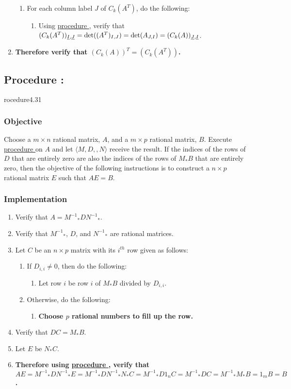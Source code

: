 \documentclass{article}
\newcommand{\ul}[1]{\protect\underline{#1}}
\newcounter{procedure}[part]
\newcommand{\procedure}[1]{\subsection*{Procedure \thepart:\theprocedure}\label{sec:procedure #1}\global\expandafter\edef\csname procedure#1\endcsname{\thepart:\theprocedure}\addtocounter{procedure}{1}}
\newcommand{\objective}{\subsubsection*{Objective}}
\newcommand{\implementation}{\subsubsection*{Implementation}}
\newcommand{\procedurehr}[1]{\hyperref[sec:procedure #1]{procedure \expandafter\csname procedure#1\endcsname}}
\begin{document}
\begin{multicols}{2}
\begin{enumerate}
					\begin{enumerate}
						\item For each column label $J$ of $C_k(A^T)$, do the following:
						\begin{enumerate}
							\item Using \procedurehr{4.29}, verify that $(C_k(A^T))_{\ul{I},\ul{J}}=\det((A^T)_{I,J})=\det(A_{J,I})=(C_k(A))_{\ul{J},\ul{I}}$.
						\end{enumerate}
					\end{enumerate}
					\item \textbf{Therefore verify that $(C_k(A))^T=(C_k(A^T))$.}
				\end{enumerate}
		\procedure{4.31}
			\objective
				Choose a $m\times n$ rational matrix, $A$, and a $m\times p$ rational matrix, $B$. Execute \procedurehr{4.25} on $A$ and let $\langle M,D,,N\rangle$ receive the result. If the indices of the rows of $D$ that are entirely zero are also the indices of the rows of $M_*B$ that are entirely zero, then the objective of the following instructions is to construct a $n\times p$ rational matrix $E$ such that $AE=B$.
			\implementation
				\begin{enumerate}
					\item Verify that $A={M^{-1}}_*D{N^{-1}}_*$.
					\item Verify that ${M^{-1}}_*$, $D$, and ${N^{-1}}_*$ are rational matrices.
					\item Let $C$ be an $n\times p$ matrix with its $i^{th}$ row given as follows:
					\begin{enumerate}
						\item If $D_{i,i}\ne 0$, then do the following:
						\begin{enumerate}
							\item Let row $i$ be row $i$ of $M_*B$ divided by $D_{i,i}$.
						\end{enumerate}
						\item Otherwise, do the following:
						\begin{enumerate}
							\item \textbf{Choose $p$ rational numbers to fill up the row.}
						\end{enumerate}
					\end{enumerate}
					\item Verify that $DC=M_*B$.
					\item Let $E$ be $N_*C$.
					\item \textbf{Therefore using \procedurehr{4.05}, verify that $AE={M^{-1}}_*D{N^{-1}}_*E={M^{-1}}_*D{N^{-1}}_*N_*C={M^{-1}}_*D1_nC={M^{-1}}_*DC={M^{-1}}_*M_*B=1_mB=B$.}

\end{enumerate}
\end{multicols}
\end{document}
